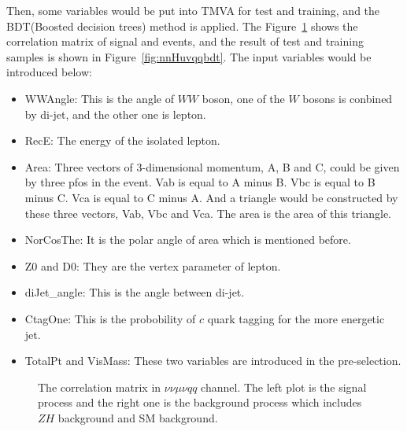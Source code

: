 \documentclass[11pt,a4paper]{cepcnote}
\begin{document}
Then, some variables would be put into TMVA for test and training, and the BDT(Boosted decision trees) method is applied.
The Figure~\ref{fig:nnHuvqqtmvacm} shows the correlation matrix of signal and events,
and the result of test and training samples is shown in Figure~\ref{fig:nnHuvqqbdt}.
The input variables would be introduced below:
\begin{itemize}
	\item WWAngle: This is the angle of $WW$ boson, one of the $W$ bosons is conbined by di-jet, and the other one is lepton.
	\item RecE: The energy of the isolated lepton.
	\item Area: Three vectors of 3-dimensional momentum, A, B and C, could be given by three pfos in the event.
		Vab is equal to A minus B. Vbc is equal to B minus C. Vca is equal to C minus A.
		And a triangle would be constructed by these three vectors, Vab, Vbc and Vca. The area is the area of this triangle.
	\item NorCosThe: It is the polar angle of area which is mentioned before. 
	\item Z0 and D0: They are the vertex parameter of lepton.
	\item diJet\_angle: This is the angle between di-jet.
	\item CtagOne: This is the probobility of $c$ quark tagging for the more energetic jet.
	\item TotalPt and VisMass: These two variables are introduced in the pre-selection.
\end{itemize}
\begin{figure}[H]
	\centering
	\caption[]{The correlation matrix in $\nu\nu\mu\nu qq$ channel. 
		The left plot is the signal process and the right one is the background process which includes $ZH$ background and 
		SM background.}
	\label{fig:nnHuvqqtmvacm}
\end{figure}
\end{document}
